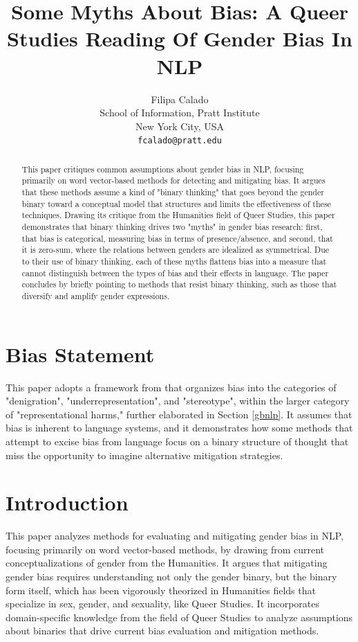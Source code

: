 \documentclass[11pt]{article}
\title{Some Myths About Bias: A Queer Studies Reading Of Gender Bias In NLP}
\author{Filipa Calado\\
  School of Information, Pratt Institute \\
  New York City, USA \\
  \texttt{fcalado@pratt.edu} }%
\begin{document}
\maketitle
\begin{abstract}
This paper critiques common assumptions about gender bias in NLP, focusing primarily on word vector-based methods for detecting and mitigating bias. It argues that these methods assume a kind of "binary thinking" that goes beyond the gender binary toward a conceptual model that structures and limits the effectiveness of these techniques. Drawing its critique from the Humanities field of Queer Studies, this paper demonstrates that binary thinking drives two "myths" in gender bias research: first, that bias is categorical, measuring bias in terms of presence/absence, and second, that it is zero-sum, where the relations between genders are idealized as symmetrical. Due to their use of binary thinking, each of these myths flattens bias into a measure that cannot distinguish between the types of bias and their effects in language. The paper concludes by briefly pointing to methods that resist binary thinking, such as those that diversify and amplify gender expressions.
\end{abstract}

\section{Bias Statement}
This paper adopts a framework from \citet{nemani:2023} that organizes
bias into the categories of "denigration", "underrepresentation", and
"stereotype", within the larger category of "representational harms," further elaborated in Section \ref{gbnlp}. It assumes
that bias is inherent to language systems, and it demonstrates how
some methods that attempt to excise bias from language focus on a binary structure of thought that miss the opportunity to imagine
alternative mitigation strategies.

\section{Introduction}
This paper analyzes methods for evaluating and mitigating gender bias in NLP, focusing primarily on word vector-based methods, by drawing from current
conceptualizations of gender from the Humanities. It argues that
mitigating gender bias requires understanding not only the gender
binary, but the binary form itself, which has been vigorously
theorized in Humanities fields that specialize in sex, gender, and
sexuality, like Queer Studies. It incorporates domain-specific
knowledge from the field of Queer Studies to analyze assumptions about
binaries that drive current bias evaluation and mitigation methods.
\end{document}
